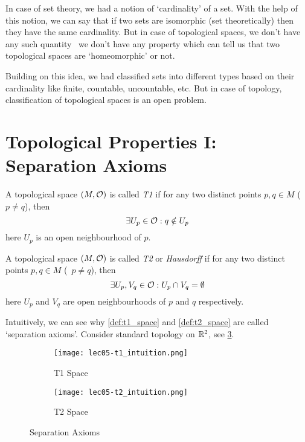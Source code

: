 
In case of set theory, we had a notion of `cardinality' of a set. With the help of this notion, we can say that if two sets are isomorphic (set theoretically) then they have the same cardinality. But in case of topological spaces, we don't have any such quantity \ie\ we don't have any property which can tell us that two topological spaces are `homeomorphic' or not.

Building on this idea, we had classified sets into different types based on their cardinality like finite, countable, uncountable, etc. But in case of topology, classification of topological spaces is an open problem.

\section{Topological Properties I: Separation Axioms}

\begin{definition}[T1 Space]\label{def:t1_space}
	A topological space \((M, \mathcal{O})\) is called \emph{T1} if for any two distinct points \(p, q \in M\) (\ie\ \(p \neq q\)), then
	\begin{equation}
		\exists U_p \in \mathcal{O}: q \notin U_p \label{eq:separation_axiom_t1}
	\end{equation}
	here \(U_p\) is an open neighbourhood of \(p\).
\end{definition}

\begin{definition}[T2 Space]\label{def:t2_space}
	A topological space \((M, \mathcal{O})\) is called \emph{T2} or \emph{Hausdorff} if for any two distinct points \(p, q \in M\) (\ie\ \(p \neq q\)), then
	\begin{equation}
		\exists U_p, V_q \in \mathcal{O}: U_p \cap V_q = \emptyset \label{eq:separation_axiom_t2}
	\end{equation}
	here \(U_p\) and \(V_q\) are open neighbourhoods of \(p\) and \(q\) respectively.
\end{definition}
Intuitively, we can see why \cref{def:t1_space} and \cref{def:t2_space} are called `separation axioms'. Consider standard topology on \(\mathbb R^2\), see \cref{fig:separation_axioms}.
\begin{figure}[H]
	\centering
	\begin{subfigure}{0.45\textwidth}
		\centering
		\texttt{[image: lec05-t1\_intuition.png]}
		\caption{T1 Space}
		\label{fig:t1_space}
	\end{subfigure}
	\begin{subfigure}{0.45\textwidth}
		\centering
		\texttt{[image: lec05-t2\_intuition.png]}
		\caption{T2 Space}
		\label{fig:t2_space}
	\end{subfigure}
	\caption{Separation Axioms}
	\label{fig:separation_axioms}
\end{figure}


